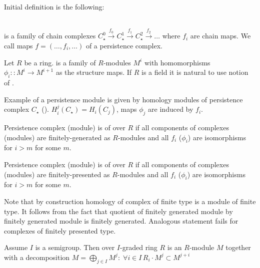 Initial definition is the following:

\begin{definition} {\cite[Definition 3.1]{Zomorodian05}}\\
   is a family of chain complexes $C_{\star}^{0} \xrightarrow{f_0} C_{\star}^{1} \xrightarrow{f_1} C_{\star}^{2} \xrightarrow{f_2} \ldots$ where $f_i$ are chain maps. We call maps $f=(\ldots,f_i,\ldots)$  of a persistence complex.
\end{definition}

\begin{definition}
  Let $R$ be a ring.  is a family of $R$-modules $M^i$ with homomorphisms $\phi_i :: M^i \to M^{i+1}$ as the structure maps. If $R$ is a field it is natural to use notion of .
\end{definition}

Example of a persistence module is given by homology modules of persistence complex $C_{\star}$ (). $H_i^j(C_{\star}) = H_i(C_{j})$, maps $\phi_j$ are induced by $f_i$.\\

\begin{definition}
  Persistence complex (module) is of  over $R$ if all components of complexes (modules) are finitely-generated as $R$-modules and all $f_i$ ($\phi_i$) are isomorphisms for $i > m$ for some $m$.
\end{definition}

\begin{definition}
  Persistence complex (module) is of  over $R$ if all components of complexes (modules) are finitely-presented as $R$-modules and all $f_i$ ($\phi_i$) are isomorphisms for $i > m$ for some $m$.
\end{definition}

Note that by construction homology of complex of finite type is a module of finite type. It follows from the fact that quotient of finitely generated module by finitely generated module is finitely generated. Analogous statement fails for complexes of finitely presented type.\\

\begin{definition}
  Assume $I$ is a semigroup. Then  over $I$-graded ring $R$ is an $R$-module $M$ together with a decomposition $M = \bigoplus_{j \in I} M^j:\; \forall i \in I\, R_i \cdot M^j \subset M^{j+i}$
\end{definition}

